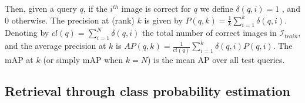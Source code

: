 \documentclass{article}
\begin{document}
Then, given a query $q$, if the $i^{th}$ image is correct for $q$ we define $\delta (q, i)=1$ , and $0$ otherwise. The precision at (rank) $k$ is given by $P(q,k) = \tfrac{1}{k} {\sum}_{i=1}^{k} \delta (q, i)$. Denoting by $cl(q) = {\sum}_{i=1}^{N} \delta (q, i)$ the total number of correct images in $\mathcal{I}_{train}$, and the average precision at $k$ is $AP(q, k) = \tfrac{1}{cl(q)}{\sum}_{i=1}^{k}\delta (q, i) P(q,i)$. The mAP at $k$ (or simply mAP when $k = N$) is the mean AP over all test queries.

\subsection{Retrieval through class probability estimation}

\end{document}
